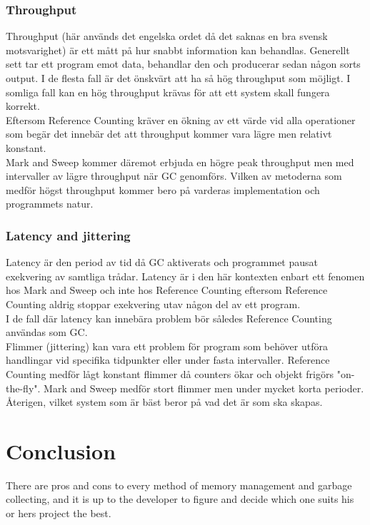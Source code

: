 \documentclass[12pt,a4paper]{article}
\begin{document}
\subsubsection{Throughput}
Throughput (här används det engelska ordet då det saknas en bra svensk motsvarighet) är ett mått på 
hur snabbt information kan behandlas. Generellt sett tar ett program emot data, behandlar den och producerar sedan någon sorts output. I de flesta fall är det önskvärt att ha så hög throughput som möjligt. I somliga fall kan en hög throughput krävas för att ett system skall fungera korrekt.\\
Eftersom Reference Counting kräver en ökning av ett värde vid alla operationer som begär det innebär det att throughput kommer vara lägre men relativt konstant.
\\
Mark and Sweep kommer däremot erbjuda en högre peak throughput men med intervaller av lägre 
throughput när GC genomförs. Vilken av metoderna som medför högst throughput kommer bero på varderas implementation och programmets natur.

\subsubsection{Latency and jittering}
Latency är den period av tid då GC aktiverats och programmet pausat exekvering av samtliga 
trådar\citep{latency}. Latency är i den här kontexten enbart ett fenomen hos Mark and Sweep och 
inte hos Reference Counting eftersom Reference Counting aldrig stoppar exekvering utav någon del av 
ett program.\\ 
I de fall där latency kan innebära problem bör således Reference Counting användas som GC.
\\
Flimmer (jittering) kan vara ett problem för program som behöver utföra handlingar vid specifika tidpunkter eller under fasta intervaller. Reference Counting medför lågt konstant flimmer då counters ökar och objekt frigörs "on-the-fly". Mark and Sweep medför stort flimmer men under mycket korta perioder. Återigen, vilket system som är bäst beror på vad det är som ska skapas.



\section{Conclusion}
There are pros and cons to every method of memory management and garbage collecting, and it is up to
the developer to figure and decide which one suits his or hers project the best.


\clearpage

\end{document}
